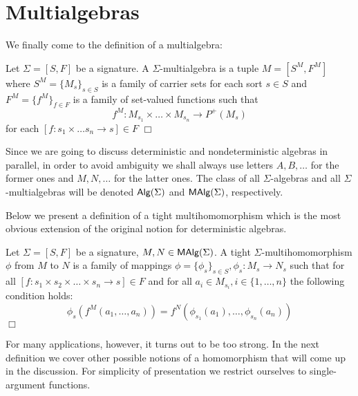 \section{Multialgebras}

We finally come to the definition of a multialgebra: 

\begin{Definition}
Let $\Sigma = [S,F]$ be a signature. A $\Sigma$-multialgebra is a
tuple $M = [S^M,F^M]$ where $S^M = \{M_s\}_{s \in S}$ is a family of
carrier sets for each sort $s \in S$ and $F^M = \{f^M\}_{f \in F}$ is
a family of set-valued functions such that
\[ 
f^M : M_{s_1} \times \ldots \times M_{s_n} \rightarrow P^+(M_s) 
\]
for each $[f : s_1 \times \ldots s_n \rightarrow s] \in F$
\hfill$\Box$
\end{Definition} 
%
Since we are going to discuss deterministic and nondeterministic
algebras in parallel, in order to avoid ambiguity we shall always use
letters $A,B,\ldots$ for the former ones and $M,N,\ldots$ for the
latter ones. The class of all $\Sigma$-algebras and all
$\Sigma$-multialgebras will be denoted $\mbox{\rm\sf Alg}(\Sigma)$ and
$\mbox{\rm\sf MAlg}(\Sigma)$, respectively.

Below we present a definition of a tight multihomomorphism which is
the most obvious extension of the original notion for deterministic
algebras.

\begin{Definition}
Let $\Sigma = [S,F]$ be a signature, $M,N \in \mbox{\rm\sf MAlg}(\Sigma)$.  A tight
$\Sigma$-multi\-homo\-mor\-phism $\phi$ from $M$ to $N$ is a family of
mappings $\phi = \{\phi_s\}_{s \in S}, \phi_s: M_s \rightarrow N_s$
such that for all $[f : s_1 \times s_2 \times \ldots \times s_n
\rightarrow s] \in F$ and for all $a_i \in M_{s_i}, i \in
\{1,\ldots,n\}$ the following condition holds:
\[ 
\phi_s(f^M(a_1,\ldots,a_n)) =
f^N(\phi_{s_1}(a_1),\ldots,\phi_{s_n}(a_n)) 
\]
\hfill$\Box$
\end{Definition}
%
For many applications, however, it turns out to be too strong. In the
next definition we cover other possible notions of a homomorphism that
will come up in the discussion. For simplicity of presentation we
restrict ourselves to single-argument functions.

